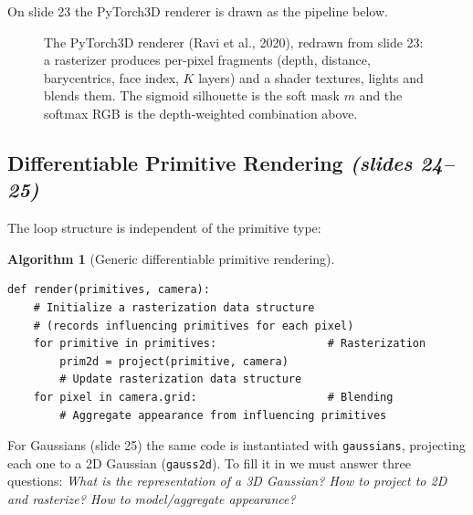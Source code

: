 \documentclass[11pt,a4paper]{article}
\DeclareMathOperator{\sigmoid}{sigmoid}
\newcommand{\sr}[1]{\texorpdfstring{\emph{(#1)}}{(#1)}}
\theoremstyle{definition}
\theoremstyle{algstyle}
\newtheorem{algorithm}[definition]{Algorithm}
\theoremstyle{plain}
\theoremstyle{remark}
\begin{document}
On slide 23 the PyTorch3D renderer is drawn as the pipeline below.

\begin{figure}[htbp]
\centering
{}
\caption{The PyTorch3D renderer (Ravi et al., 2020), redrawn from slide 23: a rasterizer produces per-pixel fragments (depth, distance, barycentrics, face index, $K$ layers) and a shader textures, lights and blends them. The sigmoid silhouette is the soft mask $m$ and the softmax RGB is the depth-weighted combination above.}
\end{figure}

\subsection{Differentiable Primitive Rendering \sr{slides 24--25}}
The loop structure is independent of the primitive type:
\begin{algorithm}[Generic differentiable primitive rendering]
\begin{lstlisting}
def render(primitives, camera):
    # Initialize a rasterization data structure
    # (records influencing primitives for each pixel)
    for primitive in primitives:                 # Rasterization
        prim2d = project(primitive, camera)
        # Update rasterization data structure
    for pixel in camera.grid:                    # Blending
        # Aggregate appearance from influencing primitives
\end{lstlisting}
\end{algorithm}
For Gaussians (slide 25) the same code is instantiated with \texttt{gaussians}, projecting each one to a 2D Gaussian (\texttt{gauss2d}). To fill it in we must answer three questions: \emph{What is the representation of a 3D Gaussian? How to project to 2D and rasterize? How to model/aggregate appearance?}
\end{document}
